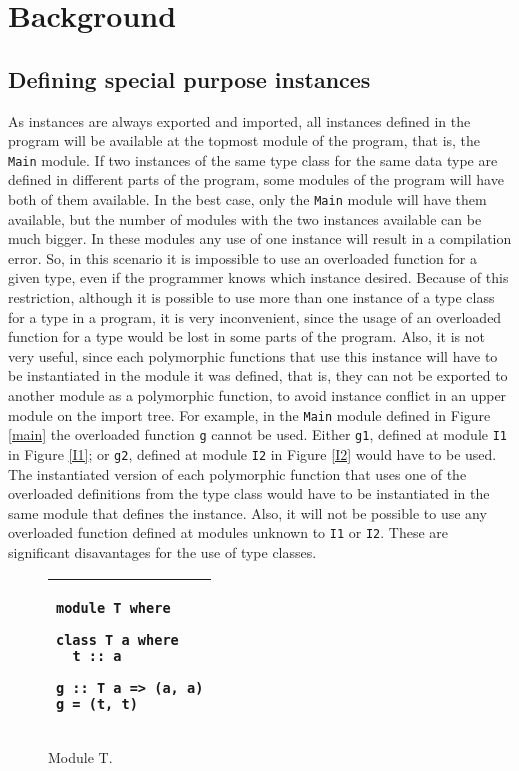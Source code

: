 \documentclass[msc]{ppgccufmg}
\begin{document}
\chapter{Background}
\label{Background}

\section{Defining special purpose instances}
\label{Special-purpose-instances}

As instances are always exported and imported, all instances defined in the
program will be available at the topmost module of the program, that is, the
\texttt{Main} module.  If two instances of the same type class for the same
data type are defined in different parts of the program, some modules of the
program will have both of them available.  In the best case, only the
\texttt{Main} module will have them available, but the number of modules with
the two instances available can be much bigger.  In these modules any use of
one instance will result in a
compilation error.  So, in this scenario it is impossible to use an overloaded
function for a given type, even if the programmer knows which instance desired.  Because of this restriction, although it is possible
to use more than one instance of a type class for a type in a program, it is
very inconvenient, since the usage of an overloaded function for a type would be
lost in some parts of the program.  Also, it is not very useful, since each polymorphic
  functions that use this instance will have to be instantiated in the module it was defined, that is, they can not be exported to another module as a polymorphic function,
  to avoid instance conflict in an upper module on the import tree.  For example, in the \texttt{Main} module defined
in Figure \ref{main} the overloaded function \texttt{g} cannot be used.  Either
\texttt{g1}, defined at module \texttt{I1} in Figure \ref{I1}; or \texttt{g2},
defined at module \texttt{I2} in Figure \ref{I2} would have to be used.  The
instantiated version of each polymorphic function that uses one of the overloaded
definitions from the type class would have to be instantiated in the same module
that defines the instance.  Also, it will not be possible to use any overloaded
function defined at modules unknown to \texttt{I1} or \texttt{I2}.  These are significant disavantages for the use of type classes.

\begin{figure}
\caption{Module T.\label{T}}
\begin{tabular}{|p{\textwidth}|}
\hline
\begin{verbatim}
module T where

class T a where
  t :: a

g :: T a => (a, a)
g = (t, t)
\end{verbatim}
\\
\hline
\end{tabular}
\end{figure}
\end{document}
